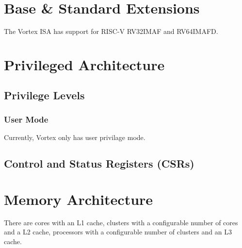 \documentclass{book}
\newcommand{\clearandresetpage}{%
  \clearpage
  \setcounter{page}{1}%
}
\begin{document}
\clearandresetpage %


\chapter{Base \& Standard Extensions}
The Vortex ISA has support for RISC-V RV32IMAF and RV64IMAFD.

\clearandresetpage %

\chapter{Privileged Architecture}
\clearandresetpage %


\section{Privilege Levels}
\subsection{User Mode}
Currently, Vortex only has user privilage mode.
\section{Control and Status Registers (CSRs)}

\clearandresetpage %

\chapter{Memory Architecture}
There are cores with an L1 cache, clusters with a configurable number of cores and a L2 cache, processors with a configurable number of clusters and an L3 cache.
\end{document}
